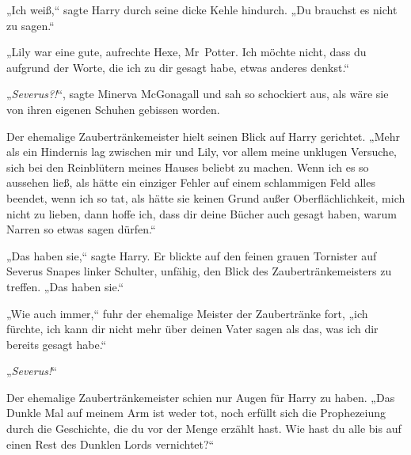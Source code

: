 „Ich weiß,“ sagte Harry durch seine dicke Kehle hindurch.
„Du brauchst es nicht zu sagen.“

„Lily war eine gute, aufrechte Hexe, Mr~Potter. Ich möchte nicht, dass du aufgrund der Worte, die ich zu dir gesagt habe, etwas anderes denkst.“

„\emph{Severus?!}“, sagte Minerva McGonagall und sah so schockiert aus, als wäre sie von ihren eigenen Schuhen gebissen worden.

Der ehemalige Zaubertränkemeister hielt seinen Blick auf Harry gerichtet.
„Mehr als ein Hindernis lag zwischen mir und Lily, vor allem meine unklugen Versuche, sich bei den Reinblütern meines Hauses beliebt zu machen. Wenn ich es so aussehen ließ, als hätte ein einziger Fehler auf einem schlammigen Feld alles beendet, wenn ich so tat, als hätte sie keinen Grund außer Oberflächlichkeit, mich nicht zu lieben, dann hoffe ich, dass dir deine Bücher auch gesagt haben, warum Narren so etwas sagen dürfen.“

„Das haben sie,“ sagte Harry.
Er blickte auf den feinen grauen Tornister auf Severus Snapes linker Schulter, unfähig, den Blick des Zaubertränkemeisters zu treffen.
„Das haben sie.“

„Wie auch immer,“ fuhr der ehemalige Meister der Zaubertränke fort, „ich fürchte, ich kann dir nicht mehr über deinen Vater sagen als das, was ich dir bereits gesagt habe.“

„\emph{Severus!}“

Der ehemalige Zaubertränkemeister schien nur Augen für Harry zu haben.
„Das Dunkle Mal auf meinem Arm ist weder tot, noch erfüllt sich die Prophezeiung durch die Geschichte, die du vor der Menge erzählt hast. Wie hast du alle bis auf einen Rest des Dunklen Lords vernichtet?“

